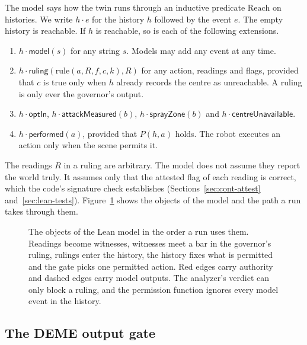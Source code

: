 The model says how the twin runs through an inductive predicate $\mathrm{Reach}$ on histories.
We write $h \cdot e$ for the history $h$ followed by the event $e$.
The empty history is reachable.
If $h$ is reachable, so is each of the following extensions.
\begin{enumerate}
  \item $h \cdot \mathsf{model}(s)$ for any string $s$.
  Models may add any event at any time.
  \item $h \cdot \mathsf{ruling}(\mathrm{rule}(a, R, f, c, k), R)$ for any action, readings and
  flags, provided that $c$ is true only when $h$ already records the centre as unreachable.
  A ruling is only ever the governor's output.
  \item $h \cdot \mathsf{optIn}$, $h \cdot \mathsf{attackMeasured}(b)$,
  $h \cdot \mathsf{sprayZone}(b)$ and $h \cdot \mathsf{centreUnavailable}$.
  \item $h \cdot \mathsf{performed}(a)$, provided that $P(h, a)$ holds.
  The robot executes an action only when the scene permits it.
\end{enumerate}
The readings $R$ in a ruling are arbitrary.
The model does not assume they report the world truly.
It assumes only that the attested flag of each reading is correct, which the code's signature
check establishes (Sections~\ref{sec:cont-attest} and~\ref{sec:lean-tests}).
Figure~\ref{fig:lean-model} shows the objects of the model and the path a run takes through
them.

\begin{figure}[t]
  \centering
  
  \caption{The objects of the Lean model in the order a run uses them. Readings become witnesses,
  witnesses meet a bar in the governor's ruling, rulings enter the history, the history fixes what
  is permitted and the gate picks one permitted action. Red edges carry authority and dashed
  edges carry model outputs. The analyzer's verdict can only block a ruling, and the permission
  function ignores every model event in the history.}
  \label{fig:lean-model}
\end{figure}

\subsection{The DEME output gate}

